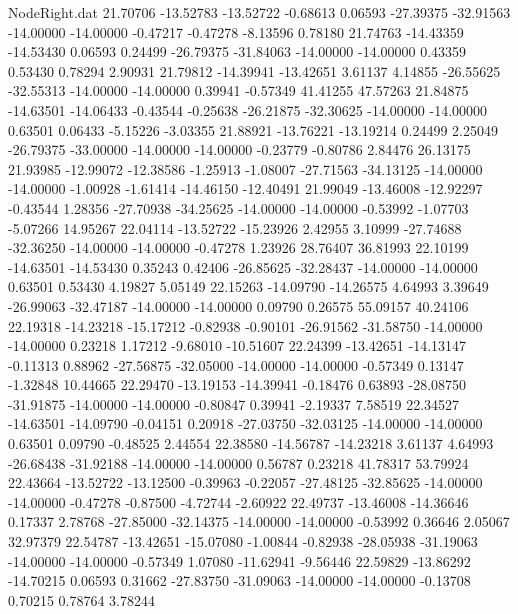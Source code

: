 \begin{filecontents}{NodeRight.dat}
  21.70706  -13.52783  -13.52722    -0.68613    0.06593  -27.39375  -32.91563  -14.00000  -14.00000   -0.47217   -0.47278   -8.13596    0.78180
  21.74763  -14.43359  -14.53430     0.06593    0.24499  -26.79375  -31.84063  -14.00000  -14.00000    0.43359    0.53430    0.78294    2.90931
  21.79812  -14.39941  -13.42651     3.61137    4.14855  -26.55625  -32.55313  -14.00000  -14.00000    0.39941   -0.57349   41.41255   47.57263
  21.84875  -14.63501  -14.06433    -0.43544   -0.25638  -26.21875  -32.30625  -14.00000  -14.00000    0.63501    0.06433   -5.15226   -3.03355
  21.88921  -13.76221  -13.19214     0.24499    2.25049  -26.79375  -33.00000  -14.00000  -14.00000   -0.23779   -0.80786    2.84476   26.13175
  21.93985  -12.99072  -12.38586    -1.25913   -1.08007  -27.71563  -34.13125  -14.00000  -14.00000   -1.00928   -1.61414  -14.46150  -12.40491
  21.99049  -13.46008  -12.92297    -0.43544    1.28356  -27.70938  -34.25625  -14.00000  -14.00000   -0.53992   -1.07703   -5.07266   14.95267
  22.04114  -13.52722  -15.23926     2.42955    3.10999  -27.74688  -32.36250  -14.00000  -14.00000   -0.47278    1.23926   28.76407   36.81993
  22.10199  -14.63501  -14.53430     0.35243    0.42406  -26.85625  -32.28437  -14.00000  -14.00000    0.63501    0.53430    4.19827    5.05149
  22.15263  -14.09790  -14.26575     4.64993    3.39649  -26.99063  -32.47187  -14.00000  -14.00000    0.09790    0.26575   55.09157   40.24106
  22.19318  -14.23218  -15.17212    -0.82938   -0.90101  -26.91562  -31.58750  -14.00000  -14.00000    0.23218    1.17212   -9.68010  -10.51607
  22.24399  -13.42651  -14.13147    -0.11313    0.88962  -27.56875  -32.05000  -14.00000  -14.00000   -0.57349    0.13147   -1.32848   10.44665
  22.29470  -13.19153  -14.39941    -0.18476    0.63893  -28.08750  -31.91875  -14.00000  -14.00000   -0.80847    0.39941   -2.19337    7.58519
  22.34527  -14.63501  -14.09790    -0.04151    0.20918  -27.03750  -32.03125  -14.00000  -14.00000    0.63501    0.09790   -0.48525    2.44554
  22.38580  -14.56787  -14.23218     3.61137    4.64993  -26.68438  -31.92188  -14.00000  -14.00000    0.56787    0.23218   41.78317   53.79924
  22.43664  -13.52722  -13.12500    -0.39963   -0.22057  -27.48125  -32.85625  -14.00000  -14.00000   -0.47278   -0.87500   -4.72744   -2.60922
  22.49737  -13.46008  -14.36646     0.17337    2.78768  -27.85000  -32.14375  -14.00000  -14.00000   -0.53992    0.36646    2.05067   32.97379
  22.54787  -13.42651  -15.07080    -1.00844   -0.82938  -28.05938  -31.19063  -14.00000  -14.00000   -0.57349    1.07080  -11.62941   -9.56446
  22.59829  -13.86292  -14.70215     0.06593    0.31662  -27.83750  -31.09063  -14.00000  -14.00000   -0.13708    0.70215    0.78764    3.78244

\end{filecontents}

